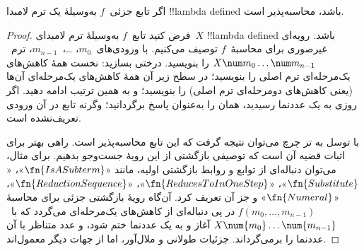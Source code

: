 \documentclass[../../../include/open-logic-section]{subfiles}
\begin{document}

\begin{thm}
اگر تابع جزئی~$f$ به‌وسیلهٔ یک ترم لامبدا !!{lambda defined} باشد،
محاسبه‌پذیر است.
\end{thm}

\begin{proof}
فرض کنید تابع~$f$ به‌وسیلهٔ ترم لامبدای~$X$ !!{lambda defined} باشد.
رویه‌ای غیرصوری برای محاسبهٔ~$f$ توصیف می‌کنیم. با ورودی‌های~$m_0$،
\dots،~$m_{n-1}$، ترم~$X \num m_0 \ldots \num m_{n-1}$ را بنویسید.
درختی بسازید: نخست همهٔ کاهش‌های یک‌مرحله‌ای ترم اصلی را بنویسید؛ در
سطح زیر آن همهٔ کاهش‌های یک‌مرحله‌ای آن‌ها (یعنی کاهش‌های دومرحله‌ای ترم
اصلی) را بنویسید؛ و به همین ترتیب ادامه دهید. اگر روزی به یک عددنما
رسیدید، همان را به‌عنوان پاسخ برگردانید؛ وگرنه تابع در آن ورودی تعریف‌نشده
است.

با توسل به تز چرچ می‌توان نتیجه گرفت که این تابع محاسبه‌پذیر است. راهی
بهتر برای اثبات قضیه آن است که توصیفی بازگشتی از این رویهٔ جست‌وجو بدهیم.
برای مثال، می‌توان دنباله‌ای از توابع و روابط بازگشتی اولیه، مانند
«$\fn{IsASubterm}$»، «$\fn{Substitute}$»،
«$\fn{ReducesToInOneStep}$»، «$\fn{ReductionSequence}$»،
«$\fn{Numeral}$» و جز آن تعریف کرد. آن‌گاه رویهٔ بازگشتی جزئی برای محاسبهٔ
$f(m_0, \dots, m_{n-1})$ در پی دنباله‌ای از کاهش‌های یک‌مرحله‌ای می‌گردد
که با~$X \num{m_0} \dots \num{m_{n-1}}$ آغاز و به یک عددنما ختم شود،
و عدد متناظر با آن عددنما را برمی‌گرداند. جزئیات طولانی و ملال‌آور، اما
از جهات دیگر معمول‌اند.
\end{proof}
\end{document}
